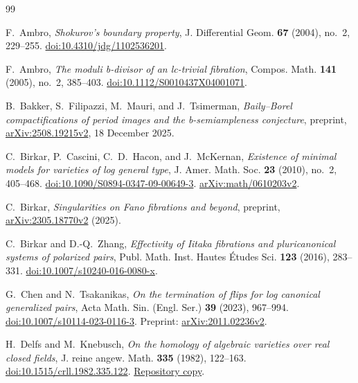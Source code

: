 \begin{thebibliography}{99}

F.~Ambro, \emph{Shokurov's boundary property},
J. Differential Geom. \textbf{67} (2004), no.~2, 229--255.
\href{https://doi.org/10.4310/jdg/1102536201}{doi:10.4310/jdg/1102536201}.

F.~Ambro, \emph{The moduli b-divisor of an lc-trivial fibration},
Compos. Math. \textbf{141} (2005), no.~2, 385--403.
\href{https://doi.org/10.1112/S0010437X04001071}{doi:10.1112/S0010437X04001071}.

B.~Bakker, S.~Filipazzi, M.~Mauri, and J.~Tsimerman,
\emph{Baily--Borel compactifications of period images and the b-semiampleness conjecture},
preprint, \href{https://arxiv.org/abs/2508.19215v2}{arXiv:2508.19215v2},
18 December 2025.

C.~Birkar, P.~Cascini, C.~D.~Hacon, and J.~McKernan,
\emph{Existence of minimal models for varieties of log general type},
J. Amer. Math. Soc. \textbf{23} (2010), no.~2, 405--468.
\href{https://doi.org/10.1090/S0894-0347-09-00649-3}{doi:10.1090/S0894-0347-09-00649-3}.
\href{https://arxiv.org/abs/math/0610203v2}{arXiv:math/0610203v2}.

C.~Birkar,
\emph{Singularities on Fano fibrations and beyond},
preprint, \href{https://arxiv.org/abs/2305.18770v2}{arXiv:2305.18770v2}
(2025).

C.~Birkar and D.-Q.~Zhang,
\emph{Effectivity of Iitaka fibrations and pluricanonical systems of polarized pairs},
Publ. Math. Inst. Hautes \'Etudes Sci. \textbf{123} (2016), 283--331.
\href{https://doi.org/10.1007/s10240-016-0080-x}{doi:10.1007/s10240-016-0080-x}.

G.~Chen and N.~Tsakanikas,
\emph{On the termination of flips for log canonical generalized pairs},
Acta Math. Sin. (Engl. Ser.) \textbf{39} (2023), 967--994.
\href{https://doi.org/10.1007/s10114-023-0116-3}{doi:10.1007/s10114-023-0116-3}.
Preprint: \href{https://arxiv.org/abs/2011.02236v2}{arXiv:2011.02236v2}.

H.~Delfs and M.~Knebusch,
\emph{On the homology of algebraic varieties over real closed fields},
J. reine angew. Math. \textbf{335} (1982), 122--163.
\href{https://doi.org/10.1515/crll.1982.335.122}{doi:10.1515/crll.1982.335.122}.
\href{https://epub.uni-regensburg.de/12717/1/ubr05118_ocr.pdf}{Repository copy}.


\end{thebibliography}
